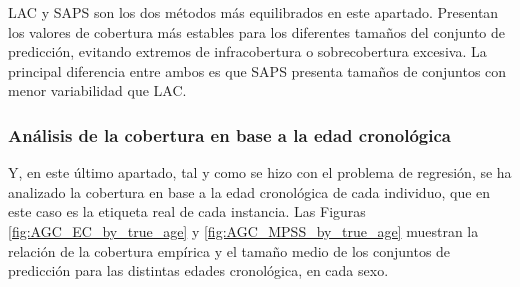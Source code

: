 LAC y SAPS son los dos métodos más equilibrados en este apartado. Presentan los valores de cobertura más estables para los diferentes tamaños del conjunto de predicción, evitando extremos de infracobertura o sobrecobertura excesiva. La principal diferencia entre ambos es que SAPS presenta tamaños de conjuntos con menor variabilidad que LAC.



\subsubsection{Análisis de la cobertura en base a la edad cronológica}

Y, en este último apartado, tal y como se hizo con el problema de regresión, se ha analizado la cobertura en base a la edad cronológica de cada individuo, que en este caso es la etiqueta real de cada instancia. 
Las Figuras \ref{fig:AGC_EC_by_true_age} y \ref{fig:AGC_MPSS_by_true_age} muestran la relación de la cobertura empírica y el tamaño medio de los conjuntos de predicción para las distintas edades cronológica, en cada sexo. 

